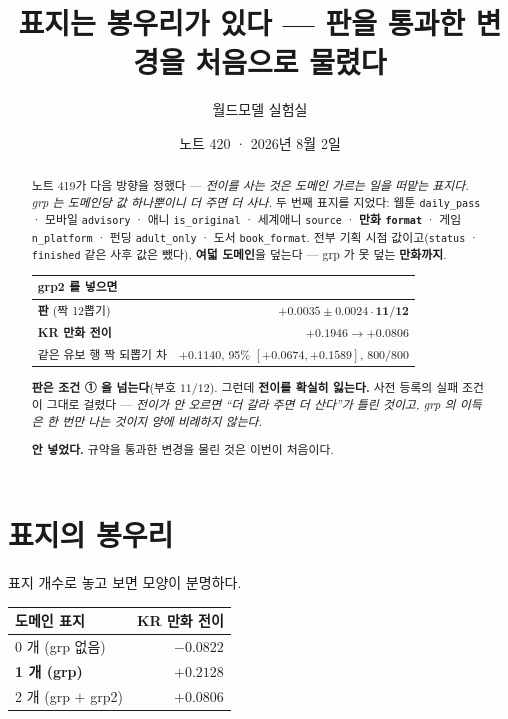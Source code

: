\documentclass[11pt]{article}
\begin{document}
\title{표지는 봉우리가 있다 --- 판을 통과한 변경을 처음으로 물렸다}
\author{월드모델 실험실}
\date{노트 420 · 2026년 8월 2일}
\maketitle

\begin{abstract}
노트 419가 다음 방향을 정했다 --- \emph{전이를 사는 것은 도메인 가르는 일을
떠맡는 표지다. grp 는 도메인당 값 하나뿐이니 더 주면 더 사나.} 두 번째
표지를 지었다: 웹툰 \texttt{daily\_pass} · 모바일 \texttt{advisory} ·
애니 \texttt{is\_original} · 세계애니 \texttt{source} · \textbf{만화
\texttt{format}} · 게임 \texttt{n\_platform} · 펀딩 \texttt{adult\_only} ·
도서 \texttt{book\_format}. 전부 기획 시점 값이고(\texttt{status} ·
\texttt{finished} 같은 사후 값은 뺐다), \textbf{여덟 도메인}을 덮는다 ---
grp 가 못 덮는 \textbf{만화까지}.

\begin{center}
\begin{tabular}{lr}
\hline
grp2 를 넣으면 & \\
\hline
\textbf{판} (짝 12뽑기) & $\mathbf{+0.0035 \pm 0.0024 \cdot 11/12}$ \\
\textbf{KR 만화 전이} & $+0.1946 \to \mathbf{+0.0806}$ \\
\quad 같은 유보 행 짝 되뽑기 차 & $+0.1140$, 95\% $[+0.0674, +0.1589]$, $800/800$ \\
\hline
\end{tabular}
\end{center}

\textbf{판은 조건 ① 을 넘는다}(부호 $11/12$). 그런데 \textbf{전이를 확실히
잃는다.} 사전 등록의 실패 조건이 그대로 걸렸다 --- \emph{전이가 안 오르면
``더 갈라 주면 더 산다''가 틀린 것이고, grp 의 이득은 한 번만 나는 것이지
양에 비례하지 않는다.}

\textbf{안 넣었다.} 규약을 통과한 변경을 물린 것은 이번이 처음이다.
\end{abstract}

\section{표지의 봉우리}

표지 개수로 놓고 보면 모양이 분명하다.

\begin{center}
\begin{tabular}{lr}
\hline
도메인 표지 & KR 만화 전이 \\
\hline
0 개 (grp 없음) & $-0.0822$ \\
\textbf{1 개 (grp)} & $\mathbf{+0.2128}$ \\
2 개 (grp $+$ grp2) & $+0.0806$ \\
\hline
\end{tabular}
\end{center}
\end{document}
